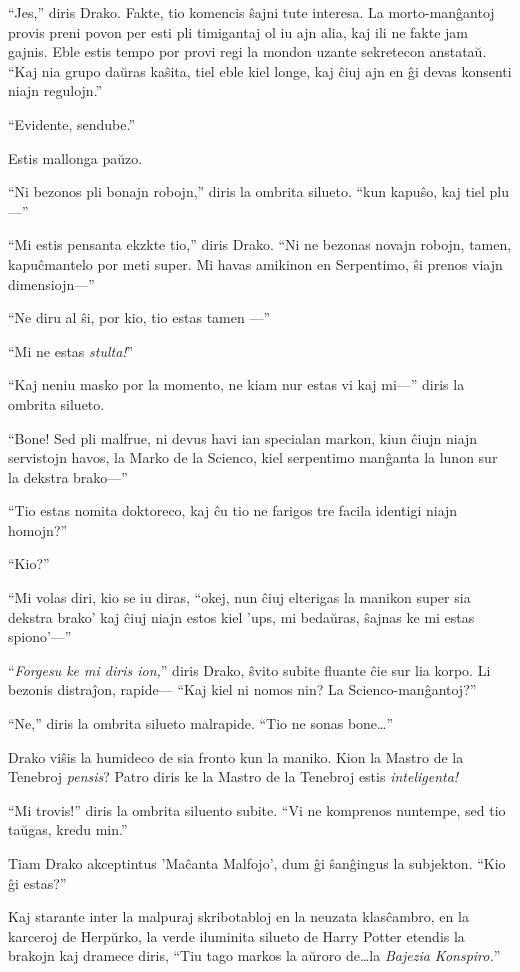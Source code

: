 ``Jes,'' diris Drako. Fakte, tio komencis ŝajni tute interesa. La
morto-manĝantoj provis preni povon per esti pli timigantaj ol iu ajn
alia, kaj ili ne fakte jam gajnis. Eble estis tempo por provi regi la
mondon uzante sekretecon anstataŭ. ``Kaj nia grupo daŭras kaŝita, tiel
eble kiel longe, kaj ĉiuj ajn en ĝi devas konsenti niajn regulojn.''

``Evidente, sendube.''

Estis mallonga paŭzo.

``Ni bezonos pli bonajn robojn,'' diris la ombrita silueto. ``kun
kapuŝo, kaj tiel plu—''

``Mi estis pensanta ekzkte tio,'' diris Drako. ``Ni ne bezonas novajn
robojn, tamen, kapuĉmantelo por meti super. Mi havas amikinon en
Serpentimo, ŝi prenos viajn dimensiojn—''

``Ne diru al ŝi, por kio, tio estas tamen —''

``Mi ne estas \emph{stulta!}''

``Kaj neniu masko por la momento, ne kiam nur estas vi kaj mi—'' diris
la ombrita silueto.

``Bone! Sed pli malfrue, ni devus havi ian specialan markon, kiun
ĉiujn niajn servistojn havos, la Marko de la Scienco, kiel serpentimo
manĝanta la lunon sur la dekstra brako—''

``Tio estas nomita doktoreco, kaj ĉu tio ne farigos tre facila
identigi niajn homojn?''

``Kio?''

``Mi volas diri, kio se iu diras, ``okej, nun ĉiuj elterigas la
manikon super sia dekstra brako' kaj ĉiuj niajn estos kiel 'ups, mi
bedaŭras, ŝajnas ke mi estas spiono'—''

``\emph{Forgesu ke mi diris ion,}'' diris Drako, ŝvito subite fluante
ĉie sur lia korpo. Li bezonis distraĵon, rapide— ``Kaj kiel ni nomos
nin? La Scienco-manĝantoj?''

``Ne,'' diris la ombrita silueto malrapide. ``Tio ne sonas
bone\ldots''

Drako viŝis la humideco de sia fronto kun la maniko. Kion la Mastro de
la Tenebroj \emph{pensis}? Patro diris ke la Mastro de la Tenebroj
estis \emph{inteligenta!}

``Mi trovis!'' diris la ombrita siluento subite. ``Vi ne komprenos
nuntempe, sed tio taŭgas, kredu min.''

Tiam Drako akceptintus 'Maĉanta Malfojo', dum ĝi ŝanĝingus la
subjekton. ``Kio ĝi estas?''

Kaj starante inter la malpuraj skribotabloj en la neuzata klasĉambro,
en la karceroj de Herpŭrko, la verde iluminita silueto de Harry Potter
etendis la brakojn kaj dramece diris, ``Tiu tago markos la aŭroro
de\ldots la \emph{Bajezia Konspiro.}''


